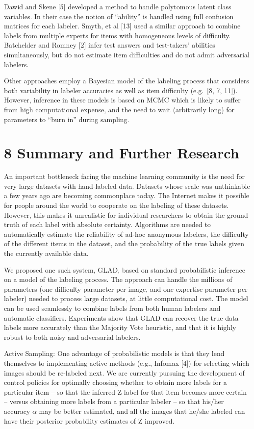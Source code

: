 \documentclass[
]{article}
\begin{document}
Dawid and Skene {[}5{]} developed a method to handle polytomous latent
class variables. In their case the notion of ``ability'' is handled
using full confusion matrices for each labeler. Smyth, et al {[}13{]}
used a similar approach to combine labels from multiple experts for
items with homogeneous levels of difficulty. Batchelder and Romney
{[}2{]} infer test answers and test-takers' abilities simultaneously,
but do not estimate item difficulties and do not admit adversarial
labelers.

Other approaches employ a Bayesian model of the labeling process that
considers both variability in labeler accuracies as well as item
difficulty (e.g.~{[}8, 7, 11{]}). However, inference in these models is
based on MCMC which is likely to suffer from high computational expense,
and the need to wait (arbitrarily long) for parameters to ``burn in''
during sampling.

\section{8 Summary and Further
Research}\label{summary-and-further-research}

An important bottleneck facing the machine learning community is the
need for very large datasets with hand-labeled data. Datasets whose
scale was unthinkable a few years ago are becoming commonplace today.
The Internet makes it possible for people around the world to cooperate
on the labeling of these datasets. However, this makes it unrealistic
for individual researchers to obtain the ground truth of each label with
absolute certainty. Algorithms are needed to automatically estimate the
reliability of ad-hoc anonymous labelers, the difficulty of the
different items in the dataset, and the probability of the true labels
given the currently available data.

We proposed one such system, GLAD, based on standard probabilistic
inference on a model of the labeling process. The approach can handle
the millions of parameters (one difficulty parameter per image, and one
expertise parameter per labeler) needed to process large datasets, at
little computational cost. The model can be used seamlessly to combine
labels from both human labelers and automatic classifiers. Experiments
show that GLAD can recover the true data labels more accurately than the
Majority Vote heuristic, and that it is highly robust to both noisy and
adversarial labelers.

Active Sampling: One advantage of probabilistic models is that they lend
themselves to implementing active methods (e.g., Infomax {[}4{]}) for
selecting which images should be re-labeled next. We are currently
pursuing the development of control policies for optimally choosing
whether to obtain more labels for a particular item -- so that the
inferred Z label for that item becomes more certain -- versus obtaining
more labels from a particular labeler -- so that his/her accuracy
\(\alpha\) may be better estimated, and all the images that he/she
labeled can have their posterior probability estimates of Z improved.
\end{document}
